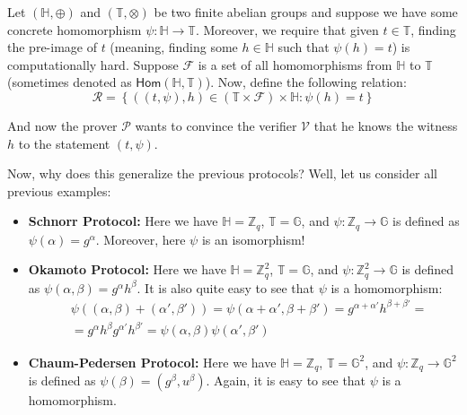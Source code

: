 \documentclass[../lecture-notes-148x210.tex]{subfiles}
\begin{document}
Let $(\mathbb{H}, \oplus)$ and $(\mathbb{T}, \otimes)$ be two finite abelian groups and suppose we have some concrete homomorphism $\psi: \mathbb{H} \to \mathbb{T}$. Moreover, we require that given $t \in \mathbb{T}$, finding the pre-image of $t$ (meaning, finding some $h \in \mathbb{H}$ such that $\psi(h)=t$) is computationally hard. Suppose $\mathcal{F}$ is a set of all homomorphisms from $\mathbb{H}$ to $\mathbb{T}$ (sometimes denoted as $\mathsf{Hom}(\mathbb{H}, \mathbb{T})$). Now, define the following relation:
\begin{equation*}
    \mathcal{R} = \left\{ ((t,\psi), h) \in (\mathbb{T} \times \mathcal{F}) \times \mathbb{H}: \psi(h) = t \right\}
\end{equation*}

And now the prover $\mathcal{P}$ wants to convince the verifier $\mathcal{V}$ that he knows the witness $h$ to the statement $(t,\psi)$. 
\begin{proposition}
    Now, why does this generalize the previous protocols? Well, let us consider all previous examples:
    \begin{itemize}
        \item \textbf{Schnorr Protocol:} Here we have $\mathbb{H} = \mathbb{Z}_q$, $\mathbb{T} = \mathbb{G}$, and $\psi: \mathbb{Z}_q \to \mathbb{G}$ is defined as $\psi(\alpha) = g^{\alpha}$. Moreover, here $\psi$ is an isomorphism!
        \item \textbf{Okamoto Protocol:} Here we have $\mathbb{H} = \mathbb{Z}_q^2$, $\mathbb{T} = \mathbb{G}$, and $\psi: \mathbb{Z}_q^2 \to \mathbb{G}$ is defined as $\psi(\alpha,\beta) = g^{\alpha}h^{\beta}$. It is also quite easy to see that $\psi$ is a homomorphism:
        \begin{equation*}
            \begin{aligned}
                &\psi((\alpha,\beta) + (\alpha',\beta')) = \psi(\alpha+\alpha',\beta+\beta') = g^{\alpha+\alpha'}h^{\beta+\beta'} = \\ 
                &= g^{\alpha}h^{\beta}g^{\alpha'}h^{\beta'} = \psi(\alpha,\beta)\psi(\alpha',\beta')                
            \end{aligned}
        \end{equation*}
        \item \textbf{Chaum-Pedersen Protocol:} Here we have $\mathbb{H} = \mathbb{Z}_q$, $\mathbb{T} = \mathbb{G}^2$, and $\psi: \mathbb{Z}_q \to \mathbb{G}^2$ is defined as $\psi(\beta) = (g^{\beta},u^{\beta})$. Again, it is easy to see that $\psi$ is a homomorphism.
    \end{itemize}
\end{proposition}
\end{document}
